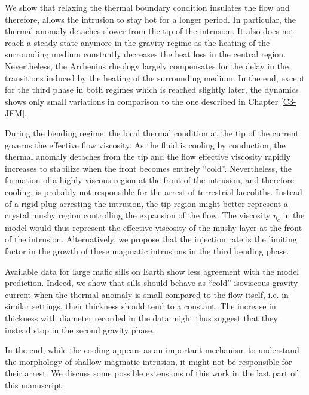 We show  that relaxing  the thermal  boundary condition  insulates the
flow and  therefore, allows  the intrusion  to stay  hot for  a longer
period.  In particular,  the thermal anomaly detaches  slower from the
tip of the  intrusion.  It also does not reach  a steady state anymore
in  the  gravity regime  as  the  heating  of the  surrounding  medium
constantly    decreases    the    heat    loss    in    the    central
region. Nevertheless,  the Arrhenius rheology largely  compensates for
the delay in the transitions induced by the heating of the surrounding
medium.  In the end, except for  the third phase in both regimes which
is reached slightly later, the dynamics shows only small variations in
comparison to the one described in Chapter \ref{C3-JFM}.

During the bending  regime, the local thermal condition at  the tip of
the current  governs the  effective flow viscosity.   As the  fluid is
cooling by conduction,  the thermal anomaly detaches from  the tip and
the flow effective  viscosity rapidly increases to  stabilize when the
front  becomes entirely  ``cold''.  Nevertheless,  the formation  of a
highly viscous  region at  the front of  the intrusion,  and therefore
cooling, is  probably not  responsible for  the arrest  of terrestrial
laccoliths. Instead of  a rigid plug arresting the  intrusion, the tip
region might better  represent a crystal mushy  region controlling the
expansion of the flow.  The viscosity $\eta_c$ in the model would thus
represent the effective  viscosity of the mushy layer at  the front of
the intrusion.  Alternatively,  we propose that the  injection rate is
the limiting factor in the growth  of these magmatic intrusions in the
third bending phase.

Available data for large mafic sills on Earth show less agreement with
the model  prediction.  Indeed,  we show that  sills should  behave as
``cold'' isoviscous gravity current when  the thermal anomaly is small
compared  to  the  flow  itself,  i.e.   in  similar  settings,  their
thickness should tend  to a constant.  The increase  in thickness with
diameter recorded  in the  data might thus  suggest that  they instead
stop in the second gravity phase.

In the  end, while the  cooling appears  as an important  mechanism to
understand the morphology of shallow  magmatic intrusion, it might not
be responsible for their arrest.   We discuss some possible extensions
of this work in the last part of this manuscript.


